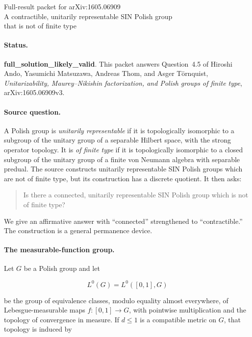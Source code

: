 \documentclass[11pt]{article}
\begin{document}
\begin{center}
{\Large Full-result packet for arXiv:1605.06909}\\[4pt]
{\large A contractible, unitarily representable SIN Polish group\\
that is not of finite type}
\end{center}

\paragraph{Status.}
\textbf{full\_solution\_likely\_valid}.  This packet answers Question~4.5
of Hiroshi Ando, Yasumichi Matsuzawa, Andreas Thom, and Asger T\"ornquist,
\emph{Unitarizability, Maurey--Nikishin factorization, and Polish groups of
finite type}, arXiv:1605.06909v3.

\paragraph{Source question.}
A Polish group is \emph{unitarily representable} if it is topologically
isomorphic to a subgroup of the unitary group of a separable Hilbert space,
with the strong operator topology.  It is \emph{of finite type} if it is
topologically isomorphic to a closed subgroup of the unitary group of a
finite von Neumann algebra with separable predual.  The source constructs
unitarily representable SIN Polish groups which are not of finite type, but
its construction has a discrete quotient.  It then asks:

\begin{quote}
Is there a connected, unitarily representable SIN Polish group which is not
of finite type?
\end{quote}

We give an affirmative answer with ``connected'' strengthened to
``contractible.''  The construction is a general permanence device.

\paragraph{The measurable-function group.}
Let \(G\) be a Polish group and let

\[
 L^0(G)=L^0([0,1],G)
\]

be the group of equivalence classes, modulo equality almost everywhere, of
Lebesgue-measurable maps \(f:[0,1]\to G\), with pointwise multiplication and
the topology of convergence in measure.  If \(d\leq1\) is a compatible
metric on \(G\), that topology is induced by
\end{document}
